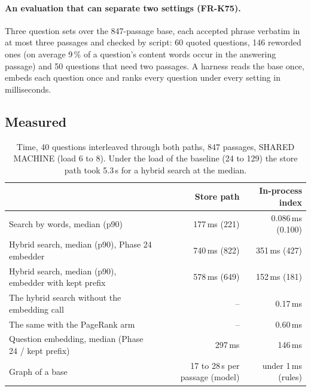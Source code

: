 \paragraph{An evaluation that can separate two settings (FR-K75).} Three question sets over the 847-passage base, each accepted phrase verbatim in at most three
passages and checked by script: 60 quoted questions, 146 reworded ones (on average 9\,\% of a question's content words occur in the answering passage) and 50
questions that need two passages. A harness reads the base once, embeds each question once and ranks every question under every setting in milliseconds.

\subsection{Measured}

\begin{table}[h]
\centering\small
\begin{tabular}{lrr}
\toprule
 & Store path & In-process index \\
\midrule
Search by words, median (p90) & 177\,ms (221) & 0.086\,ms (0.100) \\
Hybrid search, median (p90), Phase 24 embedder & 740\,ms (822) & 351\,ms (427) \\
Hybrid search, median (p90), embedder with kept prefix & 578\,ms (649) & 152\,ms (181) \\
The hybrid search without the embedding call & -- & 0.17\,ms \\
The same with the PageRank arm & -- & 0.60\,ms \\
Question embedding, median (Phase 24 / kept prefix) & 297\,ms & 146\,ms \\
Graph of a base & 17 to 28\,s per passage (model) & under 1\,ms (rules) \\
\bottomrule
\end{tabular}
\caption{Time, 40 questions interleaved through both paths, 847 passages, SHARED MACHINE (load 6 to 8). Under the load of the baseline (24 to 129) the store
path took 5.3\,s for a hybrid search at the median.}
\label{tab:p25time}
\end{table}

